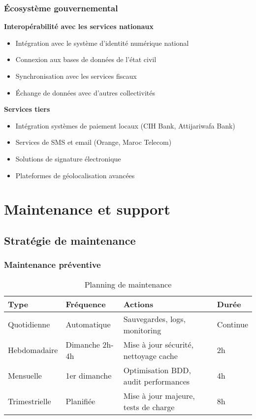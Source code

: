 \subsubsection{Écosystème gouvernemental}

\textbf{Interopérabilité avec les services nationaux}
\begin{itemize}
\item Intégration avec le système d'identité numérique national
\item Connexion aux bases de données de l'état civil
\item Synchronisation avec les services fiscaux
\item Échange de données avec d'autres collectivités
\end{itemize}

\textbf{Services tiers}
\begin{itemize}
\item Intégration systèmes de paiement locaux (CIH Bank, Attijariwafa Bank)
\item Services de SMS et email (Orange, Maroc Telecom)
\item Solutions de signature électronique
\item Plateformes de géolocalisation avancées
\end{itemize}

\section{Maintenance et support}

\subsection{Stratégie de maintenance}

\subsubsection{Maintenance préventive}

\begin{table}[H]
\centering
\caption{Planning de maintenance}
\begin{tabular}{|l|l|l|l|}
\hline
\textbf{Type} & \textbf{Fréquence} & \textbf{Actions} & \textbf{Durée} \\
\hline
Quotidienne & Automatique & Sauvegardes, logs, monitoring & Continue \\
Hebdomadaire & Dimanche 2h-4h & Mise à jour sécurité, nettoyage cache & 2h \\
Mensuelle & 1er dimanche & Optimisation BDD, audit performances & 4h \\
Trimestrielle & Planifiée & Mise à jour majeure, tests de charge & 8h \\
\hline
\end{tabular}
\end{table}

